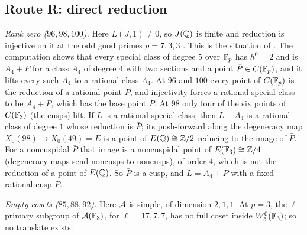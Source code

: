 \subsection{Route R: direct reduction}
\emph{Rank zero ($96,98,100$).} Here $L(J,1)\ne0$, so $J(\mathbb{Q})$ is finite \cite[Corollary~14.3]{Kato2004} and
reduction is injective on it at the odd good primes $p=7,3,3$ \cite[Appendix]{Katz1981}. This is the situation of
\cite[Proposition~7]{DerickxVanHoeij2014}. The computation
shows that every special class of degree $5$ over $\mathbb{F}_p$ has $h^0=2$ and is $\bar A_4+\bar P$ for a class $\bar
A_4$ of degree $4$ with two sections and a point $\bar P\in C(\mathbb{F}_p)$, and it lifts every such $\bar A_4$ to a
rational class $A_4$. At $96$ and $100$ every point of $C(\mathbb{F}_p)$ is the reduction of a rational point $P$, and
injectivity forces a rational special class to be $A_4+P$, which has the base point $P$. At $98$ only four of the
six points of $C(\mathbb{F}_3)$ (the cusps) lift. If $L$ is a rational special class, then $L-A_4$ is a rational class of
degree $1$ whose reduction is $\bar P$; its push-forward along the degeneracy map $X_0(98)\to X_0(49)=E$ is a point
of $E(\mathbb{Q})\cong\mathbb{Z}/2$ reducing to the image of $\bar P$. For a noncuspidal $\bar P$ that image is a noncuspidal
point of $E(\mathbb{F}_3)\cong\mathbb{Z}/4$ (degeneracy maps send noncusps to noncusps), of order $4$, which is not the
reduction of a point of $E(\mathbb{Q})$. So $\bar P$ is a cusp, and $L=A_4+P$ with a fixed rational cusp $P$.

\emph{Empty cosets ($85,88,92$).} Here $\mathcal{A}$ is simple, of dimension $2,1,1$. At $p=3$, the $\ell$-primary
subgroup of $\mathcal{A}(\mathbb{F}_3)$, for $\ell=17,7,7$, has no full coset inside $W^0_5(\mathbb{F}_3)$; so no translate exists.

